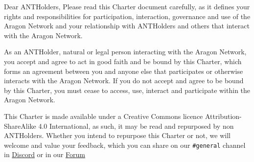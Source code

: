 
\label{chap:Introduction}

Dear \glspl{ANTHolder},
Please read this Charter document carefully, as it defines your rights and responsibilities for participation, interaction, governance and use of the Aragon Network and your relationship with \glspl{ANTHolder} and others that interact with the Aragon Network.

As an \gls{ANTHolder}, natural or legal person interacting with the Aragon Network, you accept and agree to act in good faith and be bound by this Charter, which forms an agreement between you and anyone else that participates or otherwise interacts with the Aragon Network. 
If you do not accept and agree to be bound by this Charter, you must cease to access, use, interact and participate within the Aragon Network.

This Charter is made available under a Creative Commons licence Attribution-Share\-Alike 4.0 International, as such, it may be read and repurposed by non \glspl{ANTHolder}. Whether you intend to repurpose this Charter or not, we will welcome and value your feedback, which you can share on our \texttt{\#general} channel in \href{https://discord.com/invite/eqQJkdp}{Discord} or in our \href{https://forum.aragon.org/c/community/9}{Forum} 

